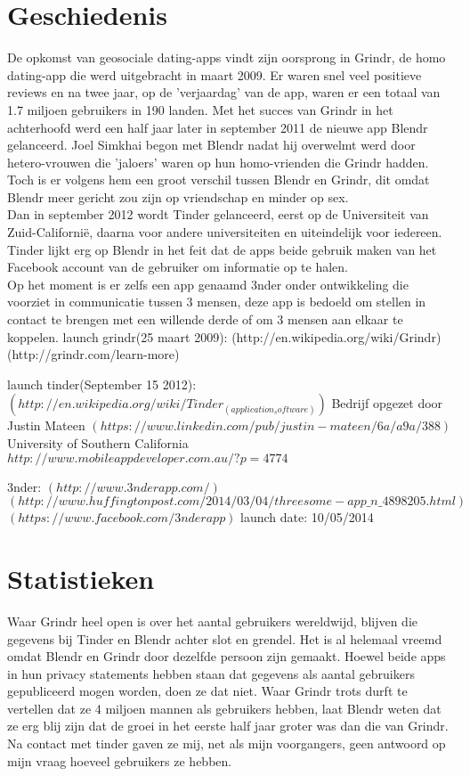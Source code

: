 \documentclass[pdftex,12pt,a4paper]{article}
\begin{document}


\section{Geschiedenis}
De opkomst van geosociale dating-apps vindt zijn oorsprong in Grindr, de homo dating-app die werd uitgebracht in maart 2009. Er waren snel veel positieve reviews en na twee jaar, op de 'verjaardag' van de app, waren er een totaal van 1.7 miljoen gebruikers in 190 landen. Met het succes van Grindr in het achterhoofd werd een half jaar later in september 2011 de nieuwe app Blendr gelanceerd. Joel Simkhai begon met Blendr nadat hij overwelmt werd door hetero-vrouwen die 'jaloers' waren op hun homo-vrienden die Grindr hadden. Toch is er volgens hem een groot verschil tussen Blendr en Grindr, dit omdat Blendr meer gericht zou zijn op vriendschap en minder op sex.
\\

Dan in september 2012 wordt Tinder gelanceerd, eerst op de Universiteit van Zuid-Californië, daarna voor andere universiteiten en uiteindelijk voor iedereen. Tinder lijkt erg op Blendr in het feit dat de apps beide gebruik maken van het Facebook account van de gebruiker om informatie op te halen.
\\

Op het moment is er zelfs een app genaamd 3nder onder ontwikkeling die voorziet in communicatie tussen 3 mensen, deze app is bedoeld om stellen in contact te brengen met een willende derde of om 3 mensen aan elkaar te koppelen.
launch grindr(25 maart 2009):
(http://en.wikipedia.org/wiki/Grindr)
(http://grindr.com/learn-more)

launch tinder(September 15 2012):
$(http://en.wikipedia.org/wiki/Tinder_(application_software))$
Bedrijf opgezet door Justin Mateen $(https://www.linkedin.com/pub/justin-mateen/6a/a9a/388)$
University of Southern California
$http://www.mobileappdeveloper.com.au/?p=4774$

3nder:
$(http://www.3nderapp.com/)$
$(http://www.huffingtonpost.com/2014/03/04/threesome-app\_n\_4898205.html)$
$(https://www.facebook.com/3nderapp)$
launch date: 10/05/2014
\section{Statistieken}
Waar Grindr heel open is over het aantal gebruikers wereldwijd, blijven die gegevens bij Tinder en Blendr achter slot en grendel. Het is al helemaal vreemd omdat Blendr en Grindr door dezelfde persoon zijn gemaakt. Hoewel beide apps in hun privacy statements hebben staan dat gegevens als aantal gebruikers gepubliceerd mogen worden, doen ze dat niet. Waar Grindr trots durft te vertellen dat ze 4 miljoen mannen als gebruikers hebben, laat Blendr weten dat ze erg blij zijn dat de groei in het eerste half jaar groter was dan die van Grindr.\cite{creeped2013} Na contact met tinder gaven ze mij, net als mijn voorgangers, geen antwoord op mijn vraag hoeveel gebruikers ze hebben.
\end{document}
